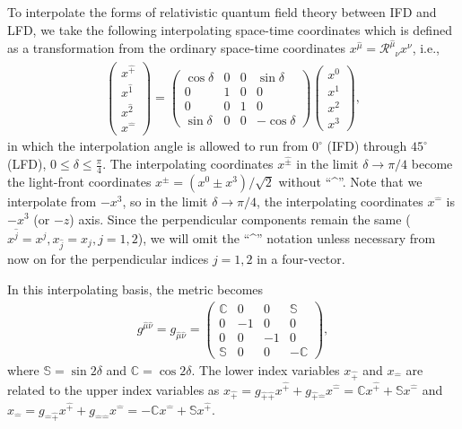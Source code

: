 \documentclass[journal,article,submit,pdftex,moreauthors]{Definitions/mdpi}
\newcommand{\muT}{\hat{\mu}}
\newcommand{\itP}[1]{\hat{#1}}
\begin{document}
To interpolate the forms of relativistic quantum field theory between IFD and LFD, we take the following interpolating space-time coordinates  \cite{Ji2001, Hornbostel1992, Ji1996, Ji2012, Ji2015EM, Ji2015SP, Ji2018QED, Ji2021QCD} which is defined as a transformation from the ordinary space-time coordinates $x^{\muT}=\mathcal{R}^{\muT}_{\phantom{\mu}{\nu}}x^{\nu}$, i.e.,
\begin{align}\label{eqn:interpolation_angle_definition}
  \begin{pmatrix}
    x^{\hat{+}}\\
    x^{\hat{1}}\\
    x^{\hat{2}}\\
    x^{\hat{-}}
  \end{pmatrix}=
  \begin{pmatrix}
    \cos\delta & 0  & 0  & \sin\delta \\
    0          & 1  & 0  & 0 \\
    0          & 0  & 1  & 0 \\
    \sin\delta & 0  & 0  & -\cos\delta
  \end{pmatrix}
  \begin{pmatrix}
    x^{0}\\
    x^{1}\\
    x^{2}\\
    x^{3}
  \end{pmatrix},
\end{align}
in which the interpolation angle is allowed to run from $0^\circ$ (IFD) through $45^\circ$ (LFD), $0\le \delta \le \frac{\pi}{4}$. The interpolating coordinates $x^{\itP{\pm}}$ in the limit $\delta\rightarrow\pi/4$ become the light-front coordinates $x^{\pm}=(x^{0}\pm x^{3})/\sqrt{2}$ without  ``\textasciicircum''. Note that we interpolate from $-x^3$, so in the limit $\delta\rightarrow\pi/4$, the interpolating coordinates $x^{\itP{-}}$ is $-x^3$ (or $-z$) axis. Since the perpendicular components remain the same ($x^{\itP{j}}=x^{j},x_{\itP{j}}=x_{j}, j=1,2$), we will omit the ``\textasciicircum''  notation unless necessary from now on for the perpendicular indices $j=1,2$ in a four-vector.

 In this interpolating basis, the metric becomes
\begin{align}\label{eqn:g_munu_interpolation}
  g^{\hat{\mu}\hat{\nu}}
  = g_{\hat{\mu}\hat{\nu}}
  =
  \begin{pmatrix}
    \mathbb{C} & 0  & 0  & \mathbb{S} \\
    0 & -1 & 0  & 0 \\
    0 & 0  & -1 & 0 \\
    \mathbb{S} & 0  & 0  & -\mathbb{C}
  \end{pmatrix},
\end{align}
where $\mathbb{S}=\sin2\delta$ and $\mathbb{C}=\cos2\delta$. The lower index variables $x_{\hat{+}}$ and $x_{\hat{-}}$ are related to the upper index variables as $x_{\hat{+}}=g_{\hat{+}\hat{+}}x^{\hat{+}}+g_{\hat{+}\hat{-}}x^{\hat{-}}=\mathbb{C}x^{\hat{+}}+\mathbb{S}x^{\hat{-}}$ and $x_{\hat{-}}=g_{\hat{-}\hat{+}}x^{\hat{+}}+g_{\hat{-}\hat{-}}x^{\hat{-}}=-\mathbb{C}x^{\hat{-}}+\mathbb{S}x^{\hat{+}}$.
\end{document}
